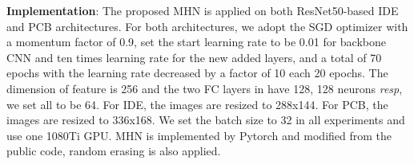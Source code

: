 \documentclass[10pt,twocolumn,letterpaper]{article}
\begin{document}
\textbf{Implementation}: The proposed MHN is applied on both ResNet50-based IDE \cite{zheng2016person} and PCB \cite{sun2018beyond} architectures. For both architectures, we adopt the SGD optimizer with a momentum factor of 0.9, set the start learning rate to be 0.01 for backbone CNN and ten times learning rate for the new added layers, and a total of 70 epochs with the learning rate decreased by a factor of 10 each 20 epochs. The dimension of feature  is 256 and the two FC layers in  have 128, 128 neurons \emph{resp}, we set all  to be 64. For IDE, the images are resized to 288x144. For PCB, the images are resized to 336x168. We set the batch size to 32 in all experiments and use one 1080Ti GPU. MHN is implemented by Pytorch \cite{pytorch} and modified from the public code\cite{layumi}, random erasing\cite{zhong2017random} is also applied.
\begin{table*}[htbp]
  \centering
\end{table*}
\end{document}
